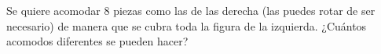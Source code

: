 Se quiere acomodar 8 piezas como las de las derecha (las puedes rotar de ser necesario) de manera que se cubra toda la figura de la izquierda. ¿Cuántos acomodos diferentes se pueden hacer?